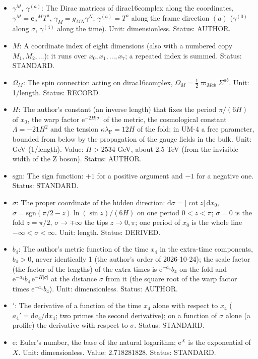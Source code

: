 \documentclass[
  10pt,
]{article}
\providecommand{\tightlist}{%
  \setlength{\itemsep}{0pt}\setlength{\parskip}{0pt}}
\begin{document}
\begin{itemize}
\tightlist
\item
  \(\gamma^M,\ \gamma^{(a)}\): The Dirac matrices of dirac16complex
  along the coordinates, \(\gamma^M = \mathbf{e}_a{}^MT^a\),
  \(\gamma_M = g_{MN}\gamma^N\); \(\gamma^{(a)} = T^a\) along the frame
  direction \((a)\) (\(\gamma^{(0)}\) along \(\sigma\), \(\gamma^{(4)}\)
  along the time). Unit: dimensionless. Status: AUTHOR.
\item
  \(M\): A coordinate index of eight dimensions (also with a numbered
  copy \(M_1, M_2, \dots\)): it runs over \(x_0, x_1, \dots, x_7\); a
  repeated index is summed. Status: STANDARD.
\item
  \(\Omega_M\): The spin connection acting on dirac16complex,
  \(\Omega_M = \frac12\varpi_{Mab}\Sigma^{ab}\). Unit: 1/length. Status:
  RECORD.
\item
  \(H\): The author's constant (an inverse length) that fixes the period
  \(\pi/(6H)\) of \(x_0\), the warp factor
  \(\mathrm{e}^{-2H\lvert\sigma\rvert}\) of the metric, the cosmological
  constant \(\Lambda = -21H^2\) and the tension
  \(\kappa\lambda_{\mathrm{F}} = 12H\) of the fold; in UM-4 a free
  parameter, bounded from below by the propagation of the gauge fields
  in the bulk. Unit: GeV (1/length). Value: \(H > 2534\) GeV, about 2.5
  TeV (from the invisible width of the Z boson). Status: AUTHOR.
\item
  \(\mathrm{sgn}\): The sign function: \(+1\) for a positive argument
  and \(-1\) for a negative one. Status: STANDARD.
\item
  \(\sigma\): The proper coordinate of the hidden direction:
  \(\mathrm{d}\sigma = \lvert\cot z\rvert\,\mathrm{d}x_0\),
  \(\sigma = \mathrm{sgn}(\pi/2 - z)\ln(\sin z)/(6H)\) on one period
  \(0 < z < \pi\); \(\sigma = 0\) is the fold \(z = \pi/2\),
  \(\sigma \to \mp\infty\) the tips \(z \to 0, \pi\); one period of
  \(x_0\) is the whole line \(-\infty < \sigma < \infty\). Unit: length.
  Status: DERIVED.
\item
  \(b_4\): The author's metric function of the time \(x_4\) in the
  extra-time components, \(b_4 > 0\), never identically 1 (the author's
  order of 2026-10-24); the scale factor (the factor of the lengths) of
  the extra times is \(\mathrm{e}^{-a_4}b_4\) on the fold and
  \(\mathrm{e}^{-a_4}b_4\,\mathrm{e}^{-H\lvert\sigma\rvert}\) at the
  distance \(\sigma\) from it (the square root of the warp factor times
  \(\mathrm{e}^{-a_4}b_4\)). Unit: dimensionless. Status: AUTHOR.
\item
  \({}'\): The derivative of a function of the time \(x_4\) alone with
  respect to \(x_4\) (\(a_4' = \mathrm{d}a_4/\mathrm{d}x_4\); two primes
  the second derivative); on a function of \(\sigma\) alone (a profile)
  the derivative with respect to \(\sigma\). Status: STANDARD.
\item
  \(\mathrm{e}\): Euler's number, the base of the natural logarithm;
  \(\mathrm{e}^{X}\) is the exponential of \(X\). Unit: dimensionless.
  Value: 2.718281828. Status: STANDARD.
\end{itemize}
\end{document}
